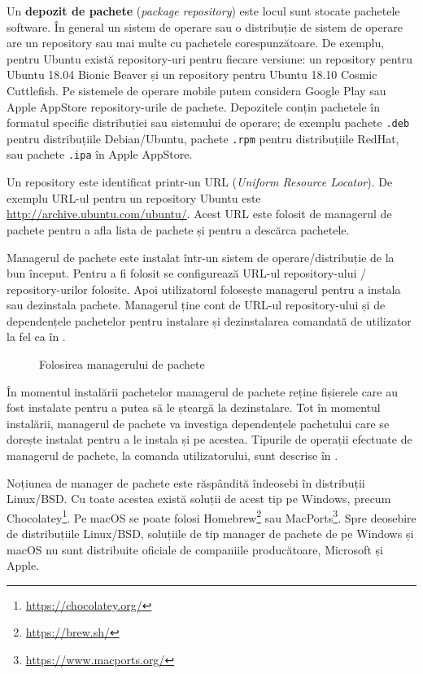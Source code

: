 Un \textbf{depozit de pachete} (\textit{package repository}) este locul sunt stocate pachetele software. În general un sistem de operare sau o distribuție de sistem de operare are un repository sau mai multe cu pachetele corespunzătoare. De exemplu, pentru Ubuntu există repository-uri pentru fiecare versiune: un repository pentru Ubuntu 18.04 Bionic Beaver și un repository pentru Ubuntu 18.10 Cosmic Cuttlefish. Pe sistemele de operare mobile putem considera Google Play sau Apple AppStore repository-urile de pachete. Depozitele conțin pachetele în formatul specific distribuției sau sistemului de operare; de exemplu pachete \texttt{.deb} pentru distribuțiile Debian/Ubuntu, pachete \texttt{.rpm} pentru distribuțiile RedHat, sau pachete \texttt{.ipa} în Apple AppStore.

Un repository este identificat printr-un URL  (\textit{Uniform Resource Locator}). De exemplu URL-ul pentru un repository Ubuntu este \url{http://archive.ubuntu.com/ubuntu/}. Acest URL este folosit de managerul de pachete pentru a afla lista de pachete și pentru a descărca pachetele.

Managerul de pachete este instalat într-un sistem de operare/distribuție de la bun început. Pentru a fi folosit se configurează URL-ul repository-ului / repository-urilor folosite. Apoi utilizatorul folosește managerul pentru a instala sau dezinstala pachete. Managerul ține cont de URL-ul repository-ului și de dependențele pachetelor pentru instalare și dezinstalarea comandată de utilizator la fel ca în .

\begin{figure}[htbp]
  \centering
  \def\svgwidth{\columnwidth}
  
  \caption{Folosirea managerului de pachete}
  \label{fig:package:manager}
\end{figure}

În momentul instalării pachetelor managerul de pachete reține fișierele care au fost instalate pentru a putea să le șteargă la dezinstalare. Tot în momentul instalării, managerul de pachete va investiga dependențele pachetului care se dorește instalat pentru a le instala și pe acestea. Tipurile de operații efectuate de managerul de pachete, la comanda utilizatorului, sunt descrise în .

Noțiunea de manager de pachete este răspândită îndeosebi în distribuții Linux/BSD. Cu toate acestea există soluții de acest tip pe Windows, precum Chocolatey\footnote{\url{https://chocolatey.org/}}. Pe macOS se poate folosi Homebrew\footnote{\url{https://brew.sh/}} sau MacPorts\footnote{\url{https://www.macports.org/}}. Spre deosebire de distribuțiile Linux/BSD, soluțiile de tip manager de pachete de pe Windows și macOS nu sunt distribuite oficiale de companiile producătoare, Microsoft și Apple.


